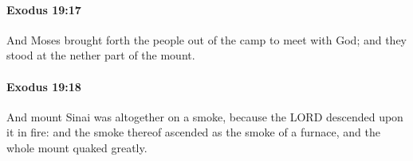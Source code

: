		\paragraph{Exodus 19:17} %
			\label{EXODUS-19-17}

			And Moses brought forth the people out of the camp to meet with God; and they stood at the nether part of the mount.


		\paragraph{Exodus 19:18} %
			\label{EXODUS-19-18}

			And mount Sinai was altogether on a smoke, because the LORD descended upon it in fire: and the smoke thereof ascended as the smoke of a furnace, and the whole mount quaked greatly.


